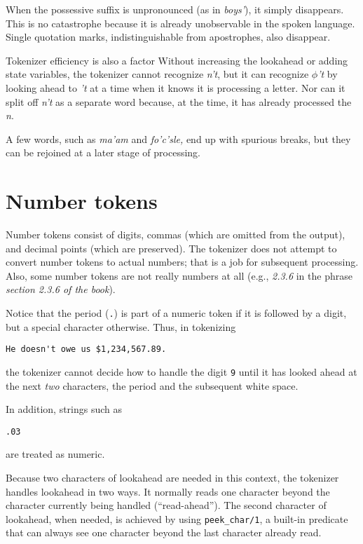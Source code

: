 \documentclass[12pt]{article}
\begin{document}
When the possessive suffix is unpronounced (as in \emph{boys'}), it simply
disappears.  
This is no catastrophe because it is already unobservable in the spoken language.
Single quotation marks, indistinguishable from apostrophes, also disappear.

Tokenizer efficiency is also a factor
Without increasing the lookahead or adding state variables, 
the tokenizer cannot recognize \emph{n't},
but it can recognize \emph{$\phi$'t} by looking ahead
to \emph{'t} at a time when it knows it is processing a letter.
Nor can it split off \emph{n't} as a separate word because, at the
time, it has already processed the \emph{n}.

A few words, such as \emph{ma'am} and \emph{fo'c'sle,} end up with
spurious breaks, but they can be rejoined at a later stage of processing.


\section{Number tokens}

Number tokens consist of digits, commas (which are omitted
from the output), and decimal points
(which are preserved).
The tokenizer does not attempt to convert number tokens to actual numbers;
that is a job for subsequent processing.
Also, some number tokens are not really numbers at all (e.g., \emph{2.3.6} in
the phrase \emph{section 2.3.6 of the book}).

Notice that the period (\verb".") is part of a numeric token if it is followed
by a digit, but a special character otherwise.  Thus, in tokenizing
\begin{verbatim}
He doesn't owe us $1,234,567.89.
\end{verbatim}
the tokenizer cannot decide how to handle the digit \verb"9" until it has
looked ahead at the next \emph{two} characters, the period and the subsequent
white space.

In addition, strings such as
\begin{verbatim}
.03
\end{verbatim}
are treated as numeric.

Because two characters of lookahead are needed in this context, the tokenizer
handles lookahead in two ways.  It normally reads one character beyond the
character currently being handled (``read-ahead'').
The second character of lookahead, when needed, is achieved by using
\verb"peek_char/1", a built-in predicate that can always see one character
beyond the last character already read.
\end{document}
